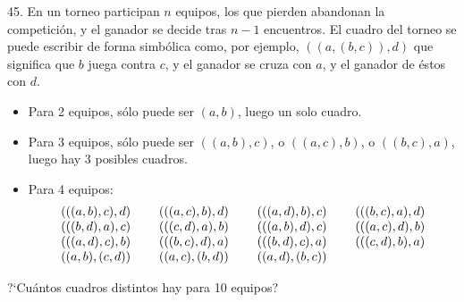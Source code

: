 \begin{problem}{45.}
	En un torneo participan $n$ equipos, los que pierden abandonan la competici\'on, y el ganador se decide tras $n-1$ encuentros.
	El cuadro del torneo se puede escribir de forma simb\'olica como, por ejemplo,  $((a,(b,c)),d)$ que significa que $b$ juega contra
$c$, y el ganador se cruza con $a$, y el ganador de \'estos con $d$.
	\begin{itemize}
		\item Para 2 equipos, s\'olo puede ser $(a,b)$, luego un solo cuadro.
		\item Para 3 equipos, s\'olo puede ser $((a,b),c)$, o $((a,c),b)$, o $((b,c),a)$, luego hay 3 posibles cuadros.
		\item Para 4 equipos:
			\begin{equation*}
				\begin{array}{@{}cccc@{}}
					(((a,b),c),d) & \quad\;(((a,c),b),d) & \quad\;(((a,d),b),c) & \quad\;(((b,c),a),d) \\
					(((b,d),a),c) & \quad\;(((c,d),a),b) & \quad\;(((a,b),d),c) & \quad\;(((a,c),d),b) \\
					(((a,d),c),b) & \quad\;(((b,c),d),a) & \quad\;(((b,d),c),a) & \quad\;(((c,d),b),a) \\
					((a,b),(c,d)) & \quad\;((a,c),(b,d)) & \quad\;((a,d),(b,c))
				\end{array}
			\end{equation*}
	\end{itemize}
	?`Cu\'antos cuadros distintos hay para 10 equipos?
\end{problem}

